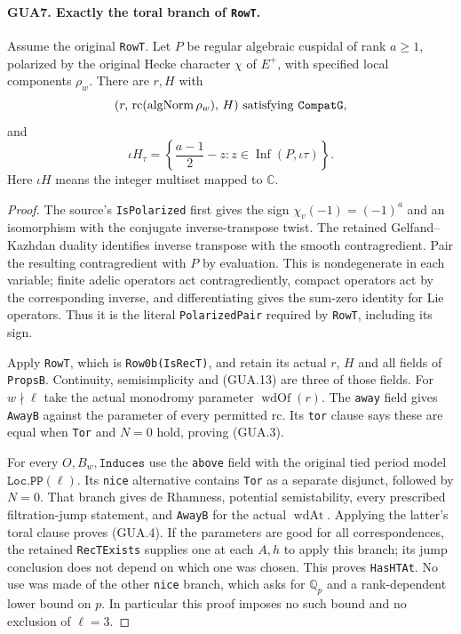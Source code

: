 \paragraph{GUA7. Exactly the toral branch of \texttt{RowT}.}
\label{claim:GUA7}
Assume the original \texttt{RowT}.  Let $P$ be regular
algebraic cuspidal of rank $a\geq1$, polarized by the
original Hecke character $\chi$ of $E^+$, with
specified local components $\rho_w$.  There are $r,H$
with
\[
 (r,\,\mathrm{rc}(\operatorname{algNorm}\rho_w),\,H)
                                      \text{ satisfying \texttt{CompatG}},
\]
and
\[
   \iota H_\tau
       =\left\{\frac{a-1}{2}-z:
             z\in\operatorname{Inf}(P,\iota\tau)\right\}.
                                                        \tag{GUA.13}
\]
Here $\iota H$ means the integer multiset mapped to $\mathbb C$.
\begin{proof}
The source's \texttt{IsPolarized} first gives the sign
$\chi_v(-1)=(-1)^a$ and an isomorphism with the conjugate
inverse-transpose twist.  The retained
Gelfand--Kazhdan duality identifies inverse transpose
with the smooth contragredient.  Pair the resulting
contragredient with $P$ by evaluation.  This is
nondegenerate in each variable; finite adelic operators
act contragrediently, compact operators act by the
corresponding inverse, and differentiating gives the
sum-zero identity for Lie operators.  Thus it is
the literal \texttt{PolarizedPair} required by
\texttt{RowT}, including its sign.

Apply \texttt{RowT}, which is \texttt{Row0b(IsRecT)},
and retain its actual $r$, $H$ and all fields of
\texttt{PropsB}.  Continuity, semisimplicity and
(GUA.13) are three of those fields.  For $w\nmid\ell$
take the actual monodromy parameter $\operatorname{wdOf}(r)$.
The \texttt{away} field gives \texttt{AwayB} against
the parameter of every permitted $\mathrm{rc}$.  Its
\texttt{tor} clause says these are equal when
\texttt{Tor} and $N=0$ hold, proving (GUA.3).

For every $O,B_w,\texttt{Induces}$ use the \texttt{above}
field with the original tied period model
$\texttt{Loc.PP}(\ell)$.  Its \texttt{nice} alternative
contains \texttt{Tor} as a separate disjunct, followed
by $N=0$.  That branch gives de Rhamness, potential
semistability, every prescribed filtration-jump statement,
and \texttt{AwayB} for the actual $\operatorname{wdAt}$.
Applying the latter's toral clause proves (GUA.4).
If the parameters are good for all correspondences,
the retained \texttt{RecTExists} supplies one at each
$A,h$ to apply this branch; its jump conclusion does
not depend on which one was chosen.  This proves
\texttt{HasHTAt}.  No use was made of the other
\texttt{nice} branch, which asks for $\mathbb Q_p$
and a rank-dependent lower bound on $p$.  In particular
this proof imposes no such bound and no exclusion of $\ell=3$.
\end{proof}

